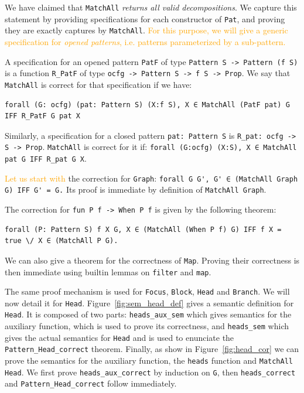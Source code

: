 \documentclass[11pt]{article}
\newcommand{\inlinecoq}[1]{\mbox{\lstinline[style=customcoq,columns=fixed,basewidth=.48em]{#1}}}
\newcommand{\ilc}[1]{\inlinecoq{#1}}
\newcommand{\gr}[1]{\textcolor{Orange}{#1}}
\newcommand{\yzt}[1]{\textcolor{ForestGreen!50}{#1}}
\newcommand{\pat}{\texttt{Pat}\xspace}
\begin{document}
\yzt{We have claimed that \ilc{MatchAll} \emph{returns all valid decompositions}. We capture this statement by providing specifications for each constructor of \pat, and proving they are exactly captures by \ilc{MatchAll}.}
\gr{For this purpose, we will give a generic specification for \emph{opened patterns}, i.e. patterns parameterized by a sub-pattern.}

A specification for an opened pattern \ilc{PatF} of type \ilc{Pattern S -> Pattern (f S)} is a function \ilc{R_PatF} of type \ilc{ocfg -> Pattern S -> f S -> Prop}. We say that \ilc{MatchAll} is correct for that specification if we have:
\begin{lstlisting}[style=customcoq,basicstyle=\small\ttfamily]
forall (G: ocfg) (pat: Pattern S) (X:f S), X ∈ MatchAll (PatF pat) G IFF R_PatF G pat X
\end{lstlisting}

Similarly, a specification for a closed pattern \ilc{pat: Pattern S} is \ilc{R_pat: ocfg -> S -> Prop}. \ilc{MatchAll} is correct for it if: \ilc{forall (G:ocfg) (X:S), X ∈ MatchAll pat G IFF R_pat G X}. 

\gr{Let us start with} the correction for \ilc{Graph}: \ilc{forall G G', G' ∈ (MatchAll Graph G) IFF G' = G.} Its proof is immediate by definition of \ilc{MatchAll Graph}.

The correction for \ilc{fun P f -> When P f} is given by the following theorem:
\begin{lstlisting}[style=customcoq,basicstyle=\small\ttfamily]
  forall (P: Pattern S) f X G, X ∈ (MatchAll (When P f) G) IFF f X = true \/ X ∈ (MatchAll P G).
\end{lstlisting}
We can also give a theorem for the correctness of \ilc{Map}. Proving their correctness is then immediate using builtin lemmas on \ilc{filter} and \ilc{map}.

The same proof mechanism is used for \ilc{Focus}, \ilc{Block}, \ilc{Head} and \ilc{Branch}. We will now detail it for \ilc{Head}.
%
%
Figure~\ref{fig:sem_head_def} gives a semantic definition for \ilc{Head}. It is composed of two parts: \ilc{heads_aux_sem} which gives semantics for the auxiliary function, which is used to prove its correctness, and \ilc{heads_sem} which gives the actual semantics for \ilc{Head} and is used to enunciate the \ilc{Pattern_Head_correct} theorem.
%
Finally, as show in Figure~\ref{fig:head_cor} we can prove the semantics for the auxiliary function, the \ilc{heads} function and \ilc{MatchAll Head}. We first prove \ilc{heads_aux_correct} by induction on \ilc{G}, then \ilc{heads_correct} and \ilc{Pattern_Head_correct} follow immediately.
\end{document}
